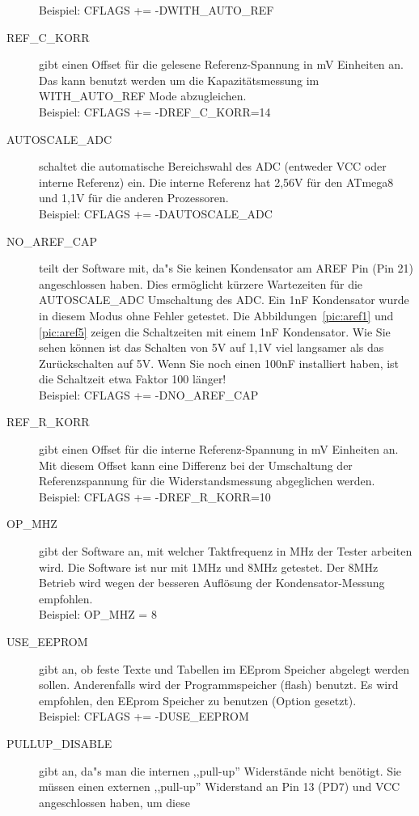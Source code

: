 \begin{description}
Beispiel:  CFLAGS += -DWITH\_AUTO\_REF
  \item[REF\_C\_KORR] gibt einen Offset f\"ur die gelesene Referenz-Spannung in mV Einheiten an.
Das kann benutzt werden um die Kapazit\"atsmessung im WITH\_AUTO\_REF Mode abzugleichen.\\
Beispiel:  CFLAGS += -DREF\_C\_KORR=14
  \item[AUTOSCALE\_ADC] schaltet die automatische Bereichswahl des ADC (entweder VCC oder interne Referenz) ein.
Die interne Referenz hat 2,56V f\"ur den ATmega8 und 1,1V f\"ur die anderen Prozessoren.\\
Beispiel: CFLAGS += -DAUTOSCALE\_ADC
  \item[NO\_AREF\_CAP] teilt der Software mit, da"s Sie keinen Kondensator am AREF Pin (Pin 21) angeschlossen haben.
Dies erm\"oglicht k\"urzere Wartezeiten f\"ur die AUTOSCALE\_ADC Umschaltung des ADC.
Ein 1nF Kondensator wurde in diesem Modus ohne Fehler getestet.
Die Abbildungen~\ref{pic:aref1} und \ref{pic:aref5} zeigen die Schaltzeiten mit einem 1nF Kondensator.
Wie Sie sehen k\"onnen ist das Schalten von 5V auf 1,1V viel langsamer als das Zur\"uckschalten auf 5V.
Wenn Sie noch einen 100nF installiert haben, ist die Schaltzeit etwa Faktor 100 l\"anger!\\
Beispiel: CFLAGS += -DNO\_AREF\_CAP
  \item[REF\_R\_KORR] gibt einen Offset f\"ur die interne Referenz-Spannung in mV Einheiten an.
Mit diesem Offset kann eine Differenz bei der Umschaltung der Referenzspannung f\"ur die Widerstandsmessung abgeglichen werden.\\
Beispiel:  CFLAGS += -DREF\_R\_KORR=10
  \item[OP\_MHZ] gibt der Software an, mit welcher Taktfrequenz in MHz der Tester arbeiten wird.
Die Software ist nur mit 1MHz und 8MHz getestet. Der 8MHz Betrieb wird wegen der besseren Aufl\"osung der
Kondensator-Messung empfohlen.\\
Beispiel: OP\_MHZ = 8
  \item[USE\_EEPROM] gibt an, ob feste Texte und Tabellen im EEprom Speicher abgelegt werden sollen.
Anderenfalls wird der Programmspeicher (flash) benutzt.
Es wird empfohlen, den EEprom Speicher zu benutzen (Option gesetzt).\\
Beispiel: CFLAGS += -DUSE\_EEPROM
  \item[PULLUP\_DISABLE] gibt an, da"s man die internen ,,pull-up'' Widerst\"ande nicht ben\"otigt.
 Sie m\"ussen einen externen ,,pull-up'' Widerstand an Pin 13 (PD7) und VCC angeschlossen haben, um diese

\end{description}

